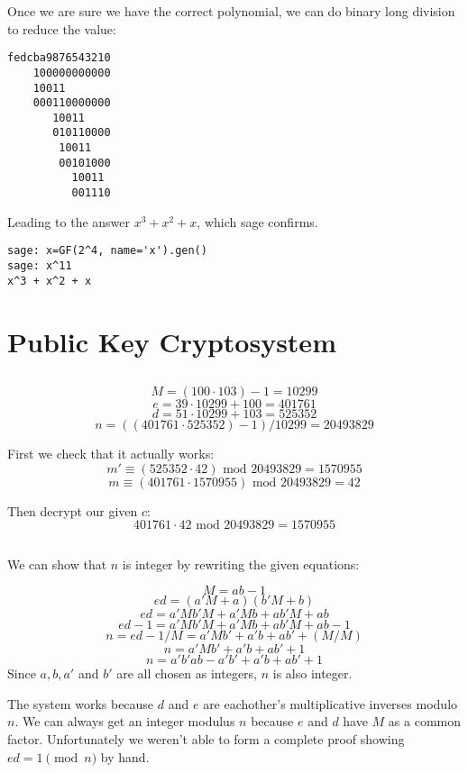 \documentclass{article}
\begin{document}
Once we are sure we have the correct polynomial, we can do binary long division to reduce the value:

\begin{verbatim}
fedcba9876543210
    100000000000
    10011
    000110000000
       10011
       010110000
        10011
        00101000
          10011
          001110
\end{verbatim}

Leading to the answer $x^3 + x^2 + x$, which sage confirms.

\begin{verbatim}
sage: x=GF(2^4, name='x').gen()
sage: x^11
x^3 + x^2 + x
\end{verbatim}

\section{Public Key Cryptosystem}

\subsection{}
\[M = (100 \cdot 103)-1=10299 \]
\[e = 39 \cdot 10299 + 100 = 401761\]
\[d = 51 \cdot 10299 + 103 = 525352\]
\[n = ((401761 \cdot 525352)-1)/10299 = 20493829\]

First we check that it actually works:
\[m'\equiv (525352 \cdot 42) \mbox{ mod 20493829} = 1570955\]
\[m\equiv (401761 \cdot 1570955) \mbox{ mod 20493829} = 42\]

Then decrypt our given $c$:
\[ 401761 \cdot 42 \mbox{ mod 20493829} = 1570955 \]


\subsection{}
We can show that $n$ is integer by rewriting the given equations:

\[M=ab-1 \]
\[ed=(a'M+a)(b'M+b)\]
\[ed=a'Mb'M + a'Mb + ab'M + ab \]
\[ed-1=a'Mb'M + a'Mb + ab'M + ab-1 \]
\[n=ed-1/M=a'Mb' + a'b  + ab' + (M/M) \]
\[n=a'Mb' + a'b  + ab' + 1 \]
\[n=a'b'ab - a'b' + a'b  + ab' + 1 \]
Since $a, b, a'$ and $b'$ are all chosen as integers, $n$ is also integer.

The system works because $d$ and $e$ are eachother's multiplicative inverses modulo $n$.
We can always get an integer modulus $n$ because $e$ and $d$ have $M$ as a common factor.
Unfortunately we weren't able to form a complete proof showing $ed = 1 \pmod n$ by hand.
\end{document}
